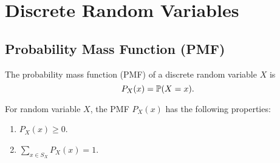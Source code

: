 \chapter{Discrete Random Variables}

\section{Probability Mass Function (PMF)}
\begin{definition}
    The probability mass function (PMF) of a discrete random variable $X$ is
    \begin{equation*}
        P_X(x) = \P{X=x}.
    \end{equation*}
\end{definition}

\begin{theorem}
    For random variable $X$, the PMF $P_X(x)$ has the following properties:
    \begin{enumerate}
        \item $P_X(x)\geq 0$.
        \item $\sum_{x\in S_X}P_X(x)=1$.
    \end{enumerate}
\end{theorem}

